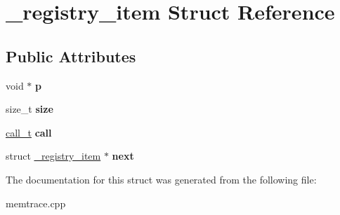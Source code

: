 \hypertarget{struct__registry__item}{}\section{\+\_\+registry\+\_\+item Struct Reference}
\label{struct__registry__item}
\subsection*{Public Attributes}
\begin{DoxyCompactItemize}
\item 
\mbox{\label{struct__registry__item_a7d2b50523d8801a40d30e17bfab37149}} 
void $\ast$ {\bfseries p}
\item 
\mbox{\label{struct__registry__item_a98122f145c9d8ef6b8e34c534307423d}} 
size\+\_\+t {\bfseries size}
\item 
\mbox{\label{struct__registry__item_ae5167771e18dc20df38808a4dafa761f}} 
\mbox{\hyperlink{structcall__t}{call\+\_\+t}} {\bfseries call}
\item 
\mbox{\label{struct__registry__item_aa659ff3f2fa74b37e31b0bd3948bbf7f}} 
struct \mbox{\hyperlink{struct__registry__item}{\+\_\+registry\+\_\+item}} $\ast$ {\bfseries next}
\end{DoxyCompactItemize}


The documentation for this struct was generated from the following file\+:\begin{DoxyCompactItemize}
\item 
memtrace.\+cpp\end{DoxyCompactItemize}
